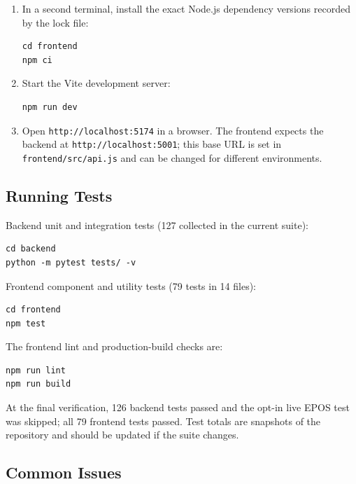 \documentclass[12pt]{article}
\begin{document}
\begin{enumerate}
    \item In a second terminal, install the exact Node.js dependency versions recorded by the lock file:
\begin{verbatim}
cd frontend
npm ci
\end{verbatim}

    \item Start the Vite development server:
\begin{verbatim}
npm run dev
\end{verbatim}

    \item Open \texttt{http://localhost:5174} in a browser. The frontend expects the backend at \texttt{http://localhost:5001}; this base URL is set in \texttt{frontend/src/api.js} and can be changed for different environments.
\end{enumerate}

\subsection*{Running Tests}

Backend unit and integration tests (127 collected in the current suite):
\begin{verbatim}
cd backend
python -m pytest tests/ -v
\end{verbatim}

Frontend component and utility tests (79 tests in 14 files):
\begin{verbatim}
cd frontend
npm test
\end{verbatim}

The frontend lint and production-build checks are:
\begin{verbatim}
npm run lint
npm run build
\end{verbatim}

At the final verification, 126 backend tests passed and the opt-in live EPOS test was skipped; all 79 frontend tests passed. Test totals are snapshots of the repository and should be updated if the suite changes.

\subsection*{Common Issues}
\end{document}
